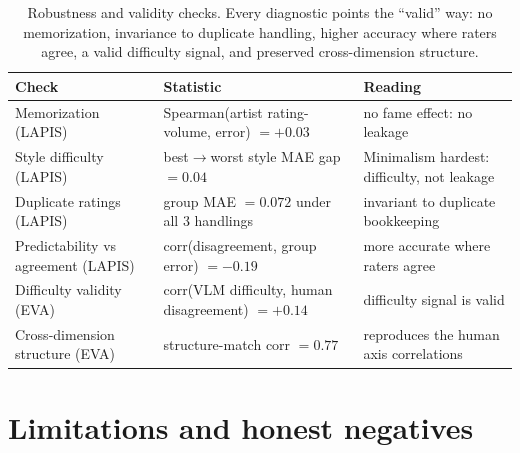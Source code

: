 \documentclass{article}
\begin{document}
\begin{table}[h]
  \caption{Robustness and validity checks. Every diagnostic points the ``valid'' way: no memorization, invariance to duplicate handling, higher accuracy where raters agree, a valid difficulty signal, and preserved cross-dimension structure.}
  \label{tab:robust}
  \centering
  \small
  \setlength{\tabcolsep}{4pt}
  \begin{tabularx}{\linewidth}{@{}
      >{\raggedright\arraybackslash\hsize=0.85\hsize}X
      >{\raggedright\arraybackslash\hsize=1.30\hsize}X
      >{\raggedright\arraybackslash\hsize=0.85\hsize}X @{}}
    \toprule
    Check & Statistic & Reading \\
    \midrule
    Memorization (LAPIS) & Spearman(artist rating-volume, error) $=+0.03$ & no fame effect: no leakage \\
    Style difficulty (LAPIS) & best$\to$worst style MAE gap $=0.04$ & Minimalism hardest: difficulty, not leakage \\
    Duplicate ratings (LAPIS) & group MAE $=0.072$ under all 3 handlings & invariant to duplicate bookkeeping \\
    Predictability vs agreement (LAPIS) & corr(disagreement, group error) $=-0.19$ & more accurate where raters agree \\
    Difficulty validity (EVA) & corr(VLM difficulty, human disagreement) $=+0.14$ & difficulty signal is valid \\
    Cross-dimension structure (EVA) & structure-match corr $=0.77$ & reproduces the human axis correlations \\
    \bottomrule
  \end{tabularx}
\end{table}



\section{Limitations and honest negatives}
\label{sec:limits}
\end{document}
